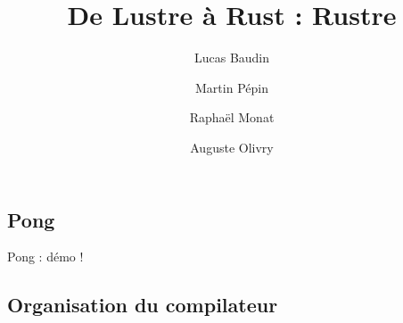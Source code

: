 \documentclass[11pt,usenames,dvipsnames]{beamer}
\author{Lucas Baudin \and Martin Pépin \and Raphaël Monat \and Auguste Olivry}
\institute[]{}
\title{De Lustre à Rust : Rustre}
\date{}
\begin{document}
\maketitle

\section{\null}
\subsection{Pong}

\begin{frame}{\null}
  \centering \Large Pong : démo !
\end{frame}

\subsection{Organisation du compilateur}
\end{document}
